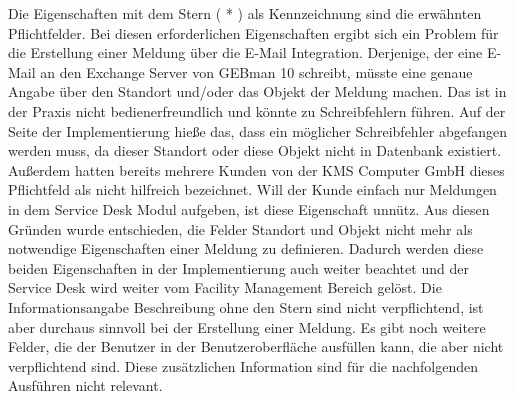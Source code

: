 \noindent
Die Eigenschaften mit dem Stern ( * ) als Kennzeichnung sind die erwähnten Pflichtfelder. Bei diesen erforderlichen Eigenschaften ergibt sich ein Problem für die Erstellung einer Meldung über die E-Mail Integration. Derjenige, der eine E-Mail an den Exchange Server von GEBman 10 schreibt, müsste eine genaue Angabe über den Standort und/oder das Objekt der Meldung machen. Das ist in der Praxis nicht bedienerfreundlich und könnte zu Schreibfehlern führen. Auf der Seite der Implementierung hieße das, dass ein möglicher Schreibfehler abgefangen werden muss, da dieser Standort oder diese Objekt nicht in Datenbank existiert. Außerdem hatten bereits mehrere Kunden von der KMS Computer GmbH dieses Pflichtfeld als nicht hilfreich bezeichnet. Will der Kunde einfach nur Meldungen in dem Service Desk Modul aufgeben, ist diese Eigenschaft unnütz. Aus diesen Gründen wurde entschieden, die Felder Standort und Objekt nicht mehr als notwendige Eigenschaften einer Meldung zu definieren. Dadurch werden diese beiden Eigenschaften in der Implementierung auch weiter beachtet und der Service Desk wird weiter vom Facility Management Bereich gelöst. \newline
Die Informationsangabe Beschreibung ohne den Stern sind nicht verpflichtend, ist aber durchaus sinnvoll bei der Erstellung einer Meldung. Es gibt noch weitere Felder, die der Benutzer in der Benutzeroberfläche ausfüllen kann, die aber nicht verpflichtend sind. Diese zusätzlichen Information sind für die nachfolgenden Ausführen nicht relevant.

